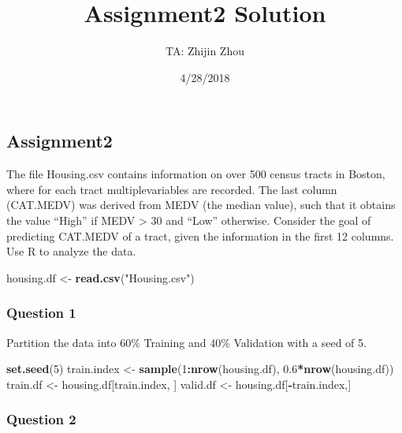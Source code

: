 \documentclass[]{article}
\title{Assignment2 Solution}
\author{TA: Zhijin Zhou}
\date{4/28/2018}
\newenvironment{Shaded}{\begin{snugshade}}{\end{snugshade}}
\newcommand{\KeywordTok}[1]{\textcolor[rgb]{0.13,0.29,0.53}{\textbf{#1}}}
\newcommand{\DecValTok}[1]{\textcolor[rgb]{0.00,0.00,0.81}{#1}}
\newcommand{\FloatTok}[1]{\textcolor[rgb]{0.00,0.00,0.81}{#1}}
\newcommand{\StringTok}[1]{\textcolor[rgb]{0.31,0.60,0.02}{#1}}
\newcommand{\OperatorTok}[1]{\textcolor[rgb]{0.81,0.36,0.00}{\textbf{#1}}}
\newcommand{\NormalTok}[1]{#1}
\begin{document}
\maketitle

\subsection{Assignment2}\label{assignment2}

The file Housing.csv contains information on over 500 census tracts in
Boston, where for each tract multiplevariables are recorded. The last
column (CAT.MEDV) was derived from MEDV (the median value), such that it
obtains the value ``High'' if MEDV \textgreater{} 30 and ``Low''
otherwise. Consider the goal of predicting CAT.MEDV of a tract, given
the information in the first 12 columns. Use R to analyze the data.

\begin{Shaded}
\begin{Highlighting}[]
\NormalTok{housing.df <-}\StringTok{ }\KeywordTok{read.csv}\NormalTok{(}\StringTok{"Housing.csv"}\NormalTok{)}
\end{Highlighting}
\end{Shaded}

\subsubsection{Question 1}\label{question-1}

Partition the data into 60\% Training and 40\% Validation with a seed of
5.

\begin{Shaded}
\begin{Highlighting}[]
\KeywordTok{set.seed}\NormalTok{(}\DecValTok{5}\NormalTok{)}
\NormalTok{train.index <-}\StringTok{ }\KeywordTok{sample}\NormalTok{(}\DecValTok{1}\OperatorTok{:}\KeywordTok{nrow}\NormalTok{(housing.df), }\FloatTok{0.6}\OperatorTok{*}\KeywordTok{nrow}\NormalTok{(housing.df))}
\NormalTok{train.df <-}\StringTok{ }\NormalTok{housing.df[train.index, ]}
\NormalTok{valid.df <-}\StringTok{ }\NormalTok{housing.df[}\OperatorTok{-}\NormalTok{train.index,]}
\end{Highlighting}
\end{Shaded}

\subsubsection{Question 2}\label{question-2}
\end{document}
